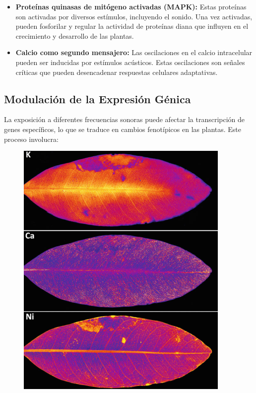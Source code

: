\documentclass[twocolumn]{article}
\begin{document}
\begin{itemize}
    \item \textbf{Proteínas quinasas de mitógeno activadas (MAPK):} Estas proteínas son activadas por diversos estímulos,
     incluyendo el sonido. Una vez activadas, pueden fosforilar y regular la actividad de proteínas diana que influyen en el 
     crecimiento y desarrollo de las plantas.
    
    \item \textbf{Calcio como segundo mensajero:} Las oscilaciones en el calcio intracelular pueden ser inducidas por estímulos
     acústicos. Estas oscilaciones son señales críticas que pueden desencadenar respuestas celulares adaptativas.
\end{itemize}

\subsection{Modulación de la Expresión Génica}

La exposición a diferentes frecuencias sonoras puede afectar la transcripción de genes específicos, lo que se traduce
 en cambios fenotípicos en las plantas. Este proceso involucra:

\begin{figure}
    \includegraphics[width=\linewidth]{imagenes/Captura5.png}
\end{figure}
\end{document}
